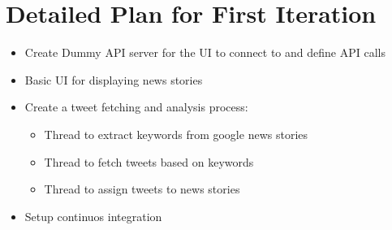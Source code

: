 \documentclass[a4paper,11pt]{article}
\begin{document}
	\section{Detailed Plan for First Iteration}
	\begin{itemize}
	  \item Create Dummy API server for the UI to connect to and define API calls
	  \item Basic UI for displaying news stories
	  \item Create a tweet fetching and analysis process:
	  \begin{itemize}
	    \item Thread to extract keywords from google news stories
	    \item Thread to fetch tweets based on keywords
	    \item Thread to assign tweets to news stories
	  \end{itemize}
	  \item Setup continuos integration
	\end{itemize}
		
\end{document}
